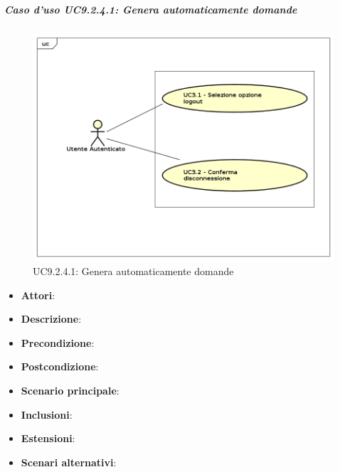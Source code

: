 			\subparagraph{Caso d'uso UC9.2.4.1: Genera automaticamente domande}
			\label{UC9.2.4.1}
			\begin{figure}[h]
				\centering
			\includegraphics[scale=0.7,keepaspectratio]{UML/UC9.png}
				\caption{UC9.2.4.1: Genera automaticamente domande}
			\end{figure}
			\FloatBarrier
			\begin{itemize}
				\item \textbf{Attori}: 
				\item \textbf{Descrizione}: 
				\item \textbf{Precondizione}: 
				\item \textbf{Postcondizione}: 
				\item \textbf{Scenario principale}:
				\item \textbf{Inclusioni}:
				\item \textbf{Estensioni}:
				\item \textbf{Scenari alternativi}:
			\end{itemize}
			

